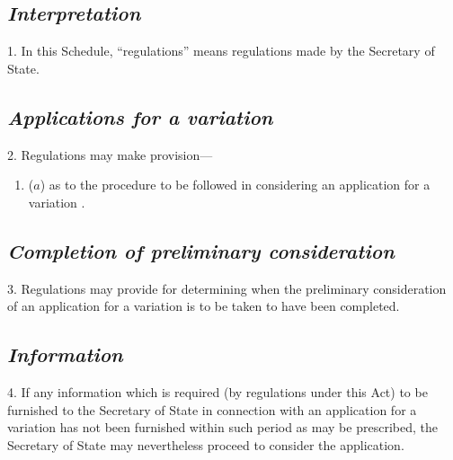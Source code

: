 \documentclass[12pt,a4paper]{article}
\begin{document}

\subsection*{\itshape Interpretation}

1. In this Schedule, “regulations” means regulations made by the Secretary of State.

\subsection*{\itshape Applications for a variation}

2. Regulations may make provision—
\begin{enumerate}\item[]
($a$) as to the procedure to be followed in considering an application for a variation%
%
.
\end{enumerate}


\subsection*{\itshape Completion of preliminary consideration}

3. Regulations may provide for determining when the preliminary consideration of an application for a variation is to be taken to have been completed.

\subsection*{\itshape Information}

4. If any information which is required (by regulations under this Act) to be furnished to the 
Secretary of State  %
in connection with an application for a variation has not been furnished within such period as may be prescribed, the 
Secretary of State  %
may nevertheless proceed to consider the application.
\end{document}
